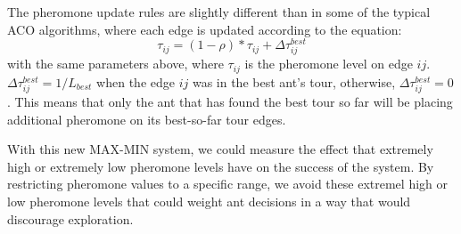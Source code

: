 \documentclass[11pt,twocolumn]{article}
\begin{document}
The pheromone update rules are slightly different than in some of the typical ACO algorithms, where each edge is updated according to the equation:
$$\tau_{ij} = (1-\rho) * \tau_{ij} + \Delta \tau_{ij}^{best}$$
with the same parameters above, where $\tau_{ij}$ is the pheromone level on edge $ij$. $\Delta \tau_{ij}^{best} = 1/L_{best} $ when the edge $ij$ was in the best ant's tour, otherwise, $\Delta \tau_{ij}^{best}=0$. This means that only the ant that has found the best tour so far will be placing additional pheromone on its best-so-far tour edges.

With this new MAX-MIN system, we could measure the effect that extremely high or extremely low pheromone levels have on the success of the system. By restricting pheromone values to a specific range, we avoid these extremel high or low pheromone levels that could weight ant decisions in a way that would discourage exploration.
\end{document}
